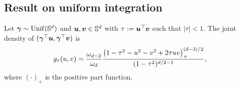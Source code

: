 \documentclass[oneside,11pt]{article}
\begin{document}
\subsection{Result on uniform integration}


\begin{proposition} \label{prp:twoprojs}
Let $\boldsymbol\gamma\sim\mathrm{Unif}(\mathbb{S}^{d})$ and $\boldsymbol{u},\boldsymbol{v}\in\mathbb{S}^{d}$ with $\tau:= \boldsymbol{u}^\top\boldsymbol{v}$ such that $|\tau|<1$. The joint density of $(\boldsymbol\gamma^\top\boldsymbol{u},\boldsymbol\gamma^\top\boldsymbol{v})$ is
    \begin{align*}
        g_{\tau}(u,v)=\frac{\om{d-2}}{\om{d}}\frac{\big(1-\tau^2-u^2-v^2+2\tau uv\big)_+^{(d-3)/2}}{(1-\tau^2)^{d/2-1}}, %
    \end{align*}
    where $(\cdot)_+$ is the positive part function. 
\end{proposition}
\end{document}
